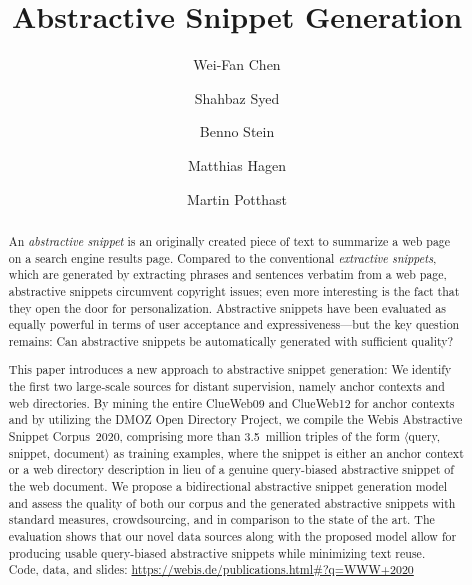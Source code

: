 \documentclass[sigconf]{acmart}
\begin{document}
\title{Abstractive Snippet Generation}


\author{Wei-Fan Chen}

\author{Shahbaz Syed}

\author{Benno Stein}

\author{Matthias Hagen}

\author{Martin Potthast}

\begin{abstract}
An {\em abstractive snippet} is an originally created piece of text to summarize a web page on a search engine results page. Compared to the conventional {\em extractive snippets}, which are generated by extracting phrases and sentences verbatim from a web page, abstractive snippets circumvent copyright issues; even more interesting is the fact that they open the door for personalization. Abstractive snippets have been evaluated as equally powerful in terms of user acceptance and expressiveness---but the key question remains: Can abstractive snippets be automatically generated with sufficient quality?

This paper introduces a new approach to abstractive snippet generation: We identify the first two large-scale sources for distant supervision, namely anchor contexts and web directories. By mining the entire ClueWeb09 and ClueWeb12 for anchor contexts and by utilizing the DMOZ Open Directory Project, we compile the Webis Abstractive Snippet Corpus~2020, comprising more than 3.5~million triples of the form $\langle$query, snippet, document$\rangle$ as training examples, where the snippet is either an anchor context or a web directory description in lieu of a genuine query-biased abstractive snippet of the web document. We propose a bidirectional abstractive snippet generation model and assess the quality of both our corpus and the generated abstractive snippets with standard measures, crowdsourcing, and in comparison to the state of the art. The evaluation shows that our novel data sources along with the proposed model allow for producing usable query-biased abstractive snippets while minimizing text reuse.\\[-2ex]

{\small\noindent
Code, data, and slides: \url{https://webis.de/publications.html\#?q=WWW+2020}}
\end{abstract}
\end{document}
